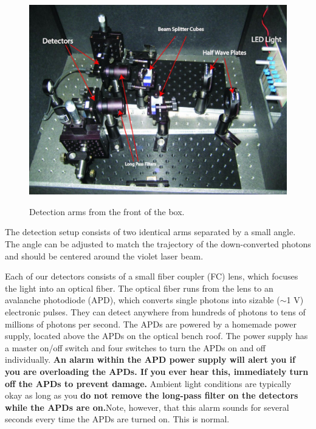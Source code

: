 \documentclass{../lab}
\begin{document}
\begin{figure}[h]
    \centering
    \href{http://dev-physicsadv.pantheon.berkeley.edu/sites/default/files/images/IMG_4032.jpg}{\includegraphics[width=0.5\linewidth]{images/IMG_4032.jpg}}
    \caption{Detection arms from the front of the box.}
    \label{fig:IMG_4032}
\end{figure}

The detection setup consists of two identical arms separated by a small angle. The angle can be adjusted to match the trajectory of the down-converted photons and should be centered around the violet laser beam.

Each of our detectors consists of a small fiber coupler (FC) lens, which focuses the light into an optical fiber. The optical fiber runs from the lens to an avalanche photodiode (APD), which converts single photons into sizable ($\sim$1 V) electronic pulses. They can detect anywhere from hundreds of photons to tens of millions of photons per second. The APDs are powered by a homemade power supply, located above the APDs on the optical bench roof. The power supply has a master on/off switch and four switches to turn the APDs on and off individually. \textbf{An alarm within the APD power supply will alert you if you are overloading the APDs. If you ever hear this, immediately turn off the APDs to prevent damage.} Ambient light conditions are typically okay as long as you \textbf{do not remove the long-pass filter on the detectors while the APDs are on.}Note, however, that this alarm sounds for several seconds every time the APDs are turned on. This is normal.
\end{document}
